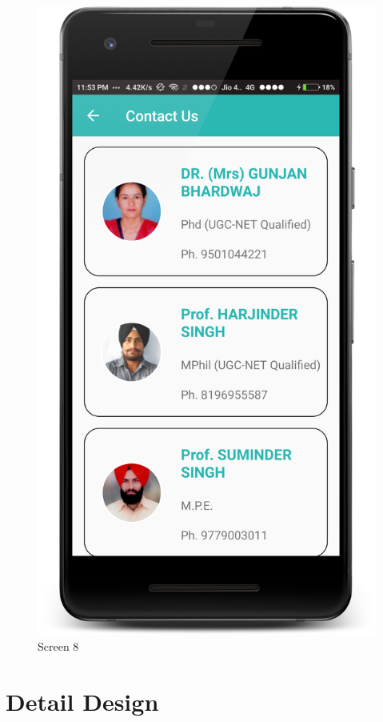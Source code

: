 \begin{figure}[ht]
\centering
\includegraphics[scale=0.38]{images/s8.png}
\caption{Screen 8}
\label{fig:8}
\end{figure}
\fi

\section{Detail Design}

